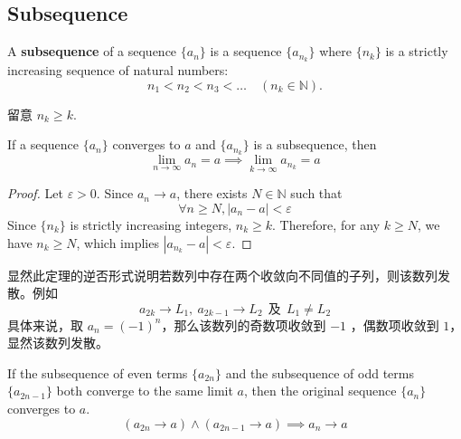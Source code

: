 \documentclass[
	UTF-8,
	11pt, %
	a4paper, %
]{LegrandOrangeBook}
\begin{document}
        \newpage

    \subsection{Subsequence}

        \begin{definition}[Subsequence]
        A \textbf{subsequence} of a sequence $\{a_n\}$ is a sequence $\{a_{n_k}\}$ where $\{n_k\}$ is a strictly increasing sequence of natural numbers:
        \[ n_1 < n_2 < n_3 < \dots \quad (n_k \in \mathbb{N}). \]
        \end{definition}

        \begin{remark}
            留意 $n_k \geq k$.
        \end{remark}

        \begin{theorem}
        If a sequence $\{a_n\}$ converges to  $a$ and $\{a_{n_k}\}$ is a subsequence, then 
        \[ \lim_{n \to \infty} a_n = a \implies \lim_{k \to \infty} a_{n_k} = a \]
        \end{theorem}

        \begin{proof}
        Let $\varepsilon > 0$. Since $a_n \to a$, there exists $N \in \mathbb{N}$ such that 
        $$\forall n \ge N, |a_n - a| < \varepsilon$$
        Since $\{n_k\}$ is strictly increasing integers, $n_k \ge k$.
        Therefore, for any $k \ge N$, we have $n_k \ge N$, which implies $|a_{n_k} - a| < \varepsilon$.
        \end{proof}

        \begin{remark}
            显然此定理的逆否形式说明若数列中存在两个收敛向不同值的子列，则该数列发散。例如
            $$
                a_{2k} \to L_1,\ a_{2k-1} \to L_2 \ \ \text{及}\ \ L_1 \neq L_2
            $$
            具体来说，取 $a_n = (-1)^n$，那么该数列的奇数项收敛到 $-1$ ，偶数项收敛到 $1$，显然该数列发散。
        \end{remark}

        \begin{theorem}
        If the subsequence of even terms $\{a_{2n}\}$ and the subsequence of odd terms $\{a_{2n-1}\}$ 
        both converge to the same limit $a$, then the original sequence $\{a_n\}$ converges to $a$.
        $$
            \left( a_{2n} \to a \right) \land \left( a_{2n-1} \to a \right) \implies a_n \to a
        $$
        \end{theorem}
\end{document}
